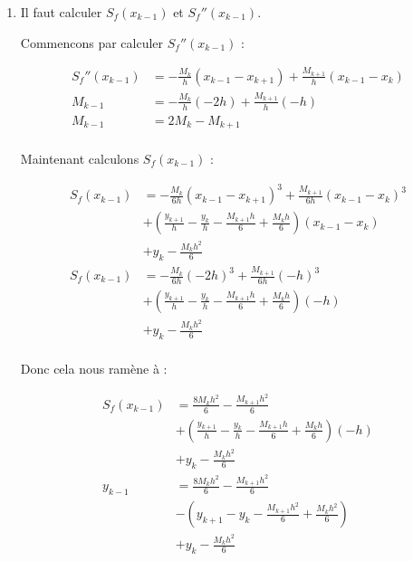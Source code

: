 \documentclass{article}
\begin{document}
\begin{enumerate}
\begin{enumerate}
  \item

    Il faut calculer $S_f(x_{k - 1})$ et $S_f''(x_{k -
      1})$. \newline \newline

    Commencons par calculer $S_f''(x_{k - 1})$ :

    \begin{equation*}
      \begin{split}
        S_f''(x_{k - 1}) & = - \frac{M_k}{h} (x_{k - 1} - x_{k + 1}) + 
        \frac{M_{k + 1}}{h} (x_{k - 1} - x_k)\\
        M_{k - 1} & = - \frac{M_k}{h} (-2h) + 
        \frac{M_{k + 1}}{h} (-h)\\
        M_{k - 1} & = 2 M_k - M_{k + 1} \\
      \end{split}
    \end{equation*}

    Maintenant calculons $S_f(x_{k - 1})$ :

    \begin{equation*}
      \begin{split}
        S_f(x_{k - 1}) & = - \frac{M_k}{6h} (x_{k - 1} - x_{k + 1})^3 + 
        \frac{M_{k + 1}}{6h} (x_{k - 1} - x_k)^3 \\
        & + \left( \frac{y_{k + 1}}{h} - \frac{y_k}{h} - \frac{M_{k
            + 1} h}{6} + \frac{M_k h}{6} \right) (x_{k - 1} - x_k) \\
        & + y_k - \frac{M_k h^2}{6} \\
        S_f(x_{k - 1}) & = - \frac{M_k}{6h} (- 2h)^3 + 
        \frac{M_{k + 1}}{6h} (-h)^3 \\
        & + \left( \frac{y_{k + 1}}{h} - \frac{y_k}{h} - \frac{M_{k
            + 1} h}{6} + \frac{M_k h}{6} \right) (-h) \\
        & + y_k - \frac{M_k h^2}{6} \\
      \end{split}
    \end{equation*}

    Donc cela nous ramène à :
    
    \begin{equation*}
      \begin{split}
        S_f(x_{k - 1}) & = \frac{8 M_k h^2}{6} - 
        \frac{M_{k + 1} h^2}{6}\\
        & + \left( \frac{y_{k + 1}}{h} - \frac{y_k}{h} - \frac{M_{k
            + 1} h}{6} + \frac{M_k h}{6} \right) (-h) \\
        & + y_k - \frac{M_k h^2}{6} \\
        y_{k - 1} & = \frac{8 M_k h^2}{6} - 
        \frac{M_{k + 1} h^2}{6}\\
        & - \left( y_{k + 1} - y_k - \frac{M_{k
            + 1} h^2}{6} + \frac{M_k h^2}{6} \right) \\
        & + y_k - \frac{M_k h^2}{6} \\
      \end{split}
    \end{equation*}


\end{enumerate}
\end{enumerate}
\end{document}
